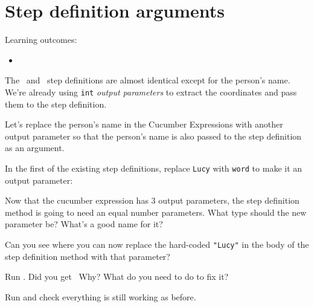 \chapter*{Step definition arguments}

\ifnotes

    Learning outcomes:
    
    \begin{itemize}
        \item  
    \end{itemize}

\fi 

\ifcontent 
    The \ and \ step definitions are almost identical except for the person's name. We're already using \texttt{\LEFTCURLY{}int\RIGHTCURLY{}} \emph{output parameters} to extract the coordinates and pass them to the step definition.
    
    Let's replace the person's name in the Cucumber Expressions with another output parameter so that the person's name is also passed to the step definition as an argument.
    
    In the first of the existing step definitions, replace \texttt{Lucy} with \texttt{\LEFTCURLY{}word\RIGHTCURLY{}} to make it an output parameter:
    
    
    Now that the cucumber expression has 3 output parameters, the step definition method is going to need an equal number parameters. What type should the new parameter be? What's a good name for it?
    
    Can you see where you can now replace the hard-coded \texttt{"Lucy"} in the body of the step definition method with that parameter?
    
    Run \CUKE{}. Did you get \ Why? What do you need to do to fix it?
    
    
    Run \CUKE{} and check everything is still working as before.
\fi